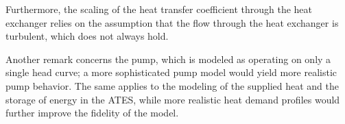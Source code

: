 Furthermore, the scaling of the heat transfer coefficient through the heat 
exchanger relies on the assumption that the flow through the heat exchanger is turbulent, which does not always hold. 

Another remark concerns the pump, which is modeled as operating on only a 
single head curve; a more sophisticated pump model would yield more realistic pump behavior. The same applies to the modeling of the supplied heat and the storage of energy in the ATES, while more realistic heat demand profiles would further improve the fidelity of the model.




